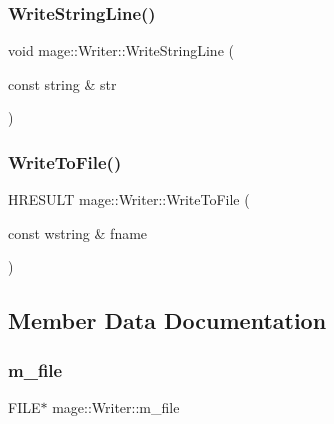 \hypertarget{classmage_1_1_writer_a542963963dc22cdecbdb3a29a3843ee9}{}\label{classmage_1_1_writer_a542963963dc22cdecbdb3a29a3843ee9} 
\subsubsection{\texorpdfstring{Write\+String\+Line()}{WriteStringLine()}\hspace{0.1cm}{\footnotesize\ttfamily [2/2]}}
{\footnotesize\ttfamily void mage\+::\+Writer\+::\+Write\+String\+Line (\begin{DoxyParamCaption}\item[{const string \&}]{str }\end{DoxyParamCaption})\hspace{0.3cm}{\ttfamily [protected]}}

\hypertarget{classmage_1_1_writer_ae9250f340229ee80dc5c518045567f7d}{}\label{classmage_1_1_writer_ae9250f340229ee80dc5c518045567f7d} 
\subsubsection{\texorpdfstring{Write\+To\+File()}{WriteToFile()}}
{\footnotesize\ttfamily H\+R\+E\+S\+U\+LT mage\+::\+Writer\+::\+Write\+To\+File (\begin{DoxyParamCaption}\item[{const wstring \&}]{fname }\end{DoxyParamCaption})}



\subsection{Member Data Documentation}
\hypertarget{classmage_1_1_writer_a04428b72245b50d45c62cbd23c2f039a}{}\label{classmage_1_1_writer_a04428b72245b50d45c62cbd23c2f039a} 
\subsubsection{\texorpdfstring{m\+\_\+file}{m\_file}}
{\footnotesize\ttfamily F\+I\+LE$\ast$ mage\+::\+Writer\+::m\+\_\+file\hspace{0.3cm}{\ttfamily [private]}}

